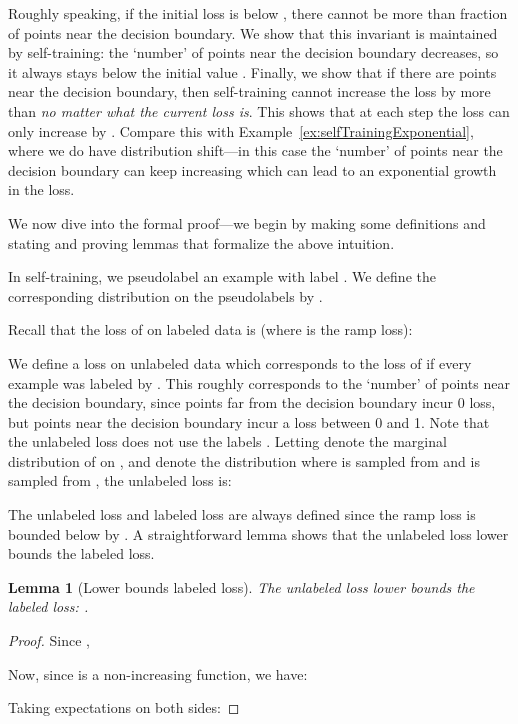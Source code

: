 \documentclass[11pt]{article}
\newtheorem{lemma}[theorem]{Lemma}
\begin{document}
Roughly speaking, if the initial loss is below , there cannot be more than  fraction of points near the decision boundary.
We show that this invariant is maintained by self-training: the `number' of points near the decision boundary decreases, so it always stays below the initial value .
Finally, we show that if there are  points near the decision boundary, then self-training cannot increase the loss by more than  \emph{no matter what the current loss is}.
This shows that at each step the loss can only increase by .
Compare this with Example~\ref{ex:selfTrainingExponential}, where we do have distribution shift---in this case the `number' of points near the decision boundary can keep increasing which can lead to an exponential growth in the loss.

We now dive into the formal proof---we begin by making some definitions and stating and proving lemmas that formalize the above intuition.

In self-training, we pseudolabel an example  with label .
We define the corresponding distribution on the pseudolabels  by .

Recall that the loss of  on labeled data is (where  is the ramp loss):


We define a loss on unlabeled data which corresponds to the loss of  if every example was labeled by .
This roughly corresponds to the `number' of points near the decision boundary, since points far from the decision boundary incur 0 loss, but points near the decision boundary incur a loss between 0 and 1.
Note that the unlabeled loss does not use the labels .
Letting  denote the marginal distribution of  on , and  denote the distribution where  is sampled from  and  is sampled from , the unlabeled loss  is:



The unlabeled loss  and labeled loss  are always defined since the ramp loss is bounded below by .
A straightforward lemma shows that the unlabeled loss lower bounds the labeled loss.

\begin{lemma}[Lower bounds labeled loss]
\label{lem:unlabeled_lower_bounds_labeled}
The unlabeled loss lower bounds the labeled loss: .
\end{lemma}

\begin{proof}
Since , 

Now, since  is a non-increasing function, we have:

Taking expectations on both sides:

\end{proof}
\end{document}
